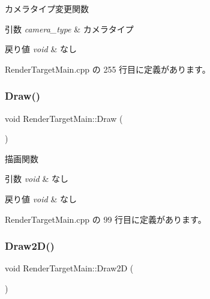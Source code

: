 カメラタイプ変更関数 


\begin{DoxyParams}{引数}
{\em camera\+\_\+type} & カメラタイプ \\
\hline
\end{DoxyParams}

\begin{DoxyRetVals}{戻り値}
{\em void} & なし \\
\hline
\end{DoxyRetVals}


 Render\+Target\+Main.\+cpp の 255 行目に定義があります。

\mbox{\label{class_render_target_main_a36625d89ab2c8ae2677648589d8cb576}} 
\subsubsection{\texorpdfstring{Draw()}{Draw()}}
{\footnotesize\ttfamily void Render\+Target\+Main\+::\+Draw (\begin{DoxyParamCaption}{ }\end{DoxyParamCaption})}



描画関数 


\begin{DoxyParams}{引数}
{\em void} & なし \\
\hline
\end{DoxyParams}

\begin{DoxyRetVals}{戻り値}
{\em void} & なし \\
\hline
\end{DoxyRetVals}


 Render\+Target\+Main.\+cpp の 99 行目に定義があります。

\mbox{\label{class_render_target_main_a5a6629f64c62e8031ccbc44c38c38554}} 
\subsubsection{\texorpdfstring{Draw2\+D()}{Draw2D()}}
{\footnotesize\ttfamily void Render\+Target\+Main\+::\+Draw2D (\begin{DoxyParamCaption}{ }\end{DoxyParamCaption})\hspace{0.3cm}{\ttfamily [private]}}



